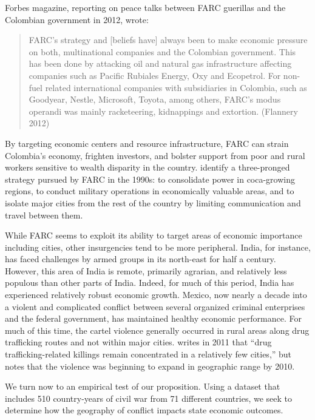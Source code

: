 Forbes magazine, reporting on peace talks between FARC guerillas and the Colombian government in 2012, wrote: 
\begin{quote}FARC's strategy and [beliefs have] always been to make economic pressure on both, multinational companies and the Colombian government. This has been done by attacking oil and natural gas infrastructure affecting companies such as Pacific Rubiales Energy, Oxy and Ecopetrol. For non-fuel related international companies with subsidiaries in Colombia, such as Goodyear, Nestle, Microsoft, Toyota, among others, FARC’s modus operandi was mainly racketeering, kidnappings and extortion. (Flannery 2012)\end{quote}
By targeting economic centers and resource infrastructure, FARC can strain Colombia's economy, frighten investors, and bolster support from poor and rural workers sensitive to wealth disparity in the country.  \cite{rabasa:chalk:2001} identify a three-pronged strategy pursued by FARC in the 1990s: to consolidate power in coca-growing regions, to conduct military operations in economically valuable areas, and to isolate major cities from the rest of the country by limiting communication and travel between them.    

While FARC seems to exploit its ability to target areas of economic importance including cities, other insurgencies tend to be more peripheral.  India, for instance, has faced challenges by armed groups in its north-east for half a century.  However, this area of India is remote, primarily agrarian, and relatively less populous than other parts of India.  Indeed, for much of this period, India has experienced relatively robust economic growth.  Mexico, now nearly a decade into a violent and complicated conflict between several organized criminal enterprises and the federal government, has maintained healthy economic performance.  For much of this time, the cartel violence generally occurred in rural areas along drug trafficking routes and not within major cities. \cite{beittel:2011} writes in 2011 that ``drug trafficking-related killings remain concentrated in a relatively few cities,'' but notes that the violence was beginning to expand in geographic range by 2010.

We turn now to an empirical test of our proposition.  Using a dataset that includes 510 country-years of civil war from 71 different countries, we seek to determine how the geography of conflict impacts state economic outcomes.


%
